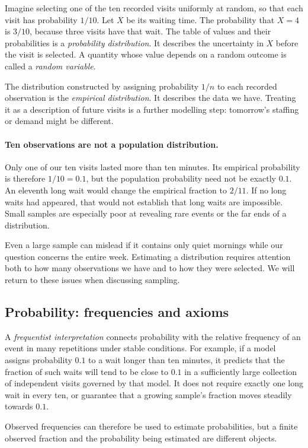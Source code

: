 Imagine selecting one of the ten recorded visits uniformly at random,
so that each visit has probability $1/10$. Let $X$ be its waiting time.
The probability that $X=4$ is $3/10$, because three visits have that wait.
The table of values and their probabilities is a \emph{probability
distribution}. It describes the uncertainty in $X$ before the visit is
selected. A quantity whose value depends on a random outcome is called
a \emph{random variable}.

The distribution constructed by assigning probability $1/n$ to each
recorded observation is the \emph{empirical distribution}. It describes
the data we have. Treating it as a description of future visits is a further
modelling step: tomorrow's staffing or demand might be different.

\paragraph{Ten observations are not a population distribution.}
Only one of our ten visits lasted more than ten minutes. Its empirical
probability is therefore $1/10=0.1$, but the population probability need
not be exactly $0.1$. An eleventh long wait would change the empirical
fraction to $2/11$. If no long waits had appeared, that would not establish
that long waits are impossible. Small samples are especially poor at
revealing rare events or the far ends of a distribution.

Even a large sample can mislead if it contains only quiet mornings while
our question concerns the entire week. Estimating a distribution requires
attention both to how many observations we have and to how they were
selected. We will return to these issues when discussing sampling.

\subsection{Probability: frequencies and axioms}
A \emph{frequentist interpretation} connects probability with the relative
frequency of an event in many repetitions under stable conditions. For
example, if a model assigns probability $0.1$ to a wait longer than ten
minutes, it predicts that the fraction of such waits will tend to be close
to $0.1$ in a sufficiently large collection of independent visits governed
by that model. It does not require exactly one long wait in every ten,
or guarantee that a growing sample's fraction moves steadily towards $0.1$.

Observed frequencies can therefore be used to estimate probabilities,
but a finite observed fraction and the probability being estimated are
different objects.

